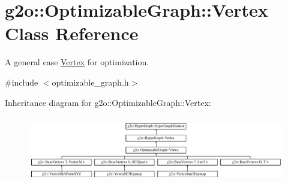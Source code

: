 \hypertarget{classg2o_1_1_optimizable_graph_1_1_vertex}{}\section{g2o\+:\+:Optimizable\+Graph\+:\+:Vertex Class Reference}
\label{classg2o_1_1_optimizable_graph_1_1_vertex}


A general case \mbox{\hyperlink{classg2o_1_1_optimizable_graph_1_1_vertex}{Vertex}} for optimization.  




{\ttfamily \#include $<$optimizable\+\_\+graph.\+h$>$}

Inheritance diagram for g2o\+:\+:Optimizable\+Graph\+:\+:Vertex\+:\begin{figure}[H]
\begin{center}
\leavevmode
\includegraphics[height=2.953586cm]{classg2o_1_1_optimizable_graph_1_1_vertex}
\end{center}
\end{figure}
